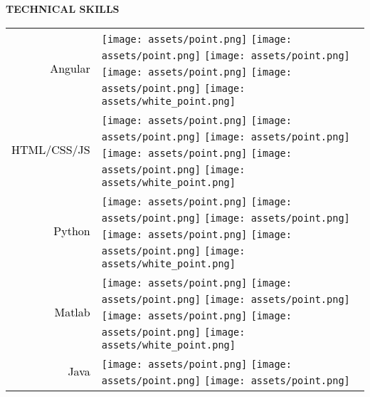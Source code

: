 \documentclass[../main.tex]{subfiles}
\begin{document}
\vspace*{0.5cm}

\textbf{\textcolor{myCV2}{TECHNICAL SKILLS\underline{\hspace{4.2cm}}}}
\vspace*{0.2cm}

    \begin{tabular}{r l}
    \textcolor{black}{\vspace*{0.1cm}Angular} &            
            \texttt{[image: assets/point.png]}
            \texttt{[image: assets/point.png]}
            \texttt{[image: assets/point.png]}
            \texttt{[image: assets/point.png]}
            \texttt{[image: assets/point.png]}
            \texttt{[image: assets/white\_point.png]}\\
    \textcolor{black}{\vspace*{0.1cm}HTML/CSS/JS} &
            \texttt{[image: assets/point.png]}
            \texttt{[image: assets/point.png]}
            \texttt{[image: assets/point.png]}
            \texttt{[image: assets/point.png]}
            \texttt{[image: assets/point.png]}
            \texttt{[image: assets/white\_point.png]}\\
    \textcolor{black}{\vspace*{0.1cm}Python} &
            \texttt{[image: assets/point.png]}
            \texttt{[image: assets/point.png]}
            \texttt{[image: assets/point.png]}
            \texttt{[image: assets/point.png]}
            \texttt{[image: assets/point.png]}
            \texttt{[image: assets/white\_point.png]}\\
    \textcolor{black}{\vspace*{0.1cm}Matlab} &
            \texttt{[image: assets/point.png]}
            \texttt{[image: assets/point.png]}
            \texttt{[image: assets/point.png]}
            \texttt{[image: assets/point.png]}
            \texttt{[image: assets/point.png]}
            \texttt{[image: assets/white\_point.png]}\\
    \textcolor{black}{\vspace*{0.1cm}Java} &
            \texttt{[image: assets/point.png]}
            \texttt{[image: assets/point.png]}
            \texttt{[image: assets/point.png]}

\end{tabular}
\end{document}
